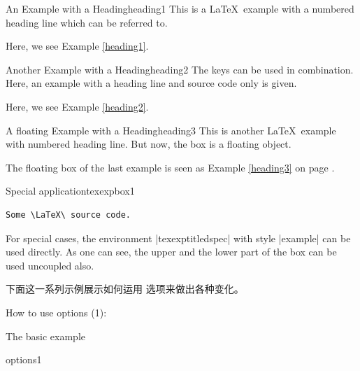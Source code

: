 \begin{dispExample}
\begin{texexptitled}{An Example with a Heading}{heading1}
This is a \LaTeX\ example with a numbered heading line
which can be referred to.
\end{texexptitled}
Here, we see Example \ref{heading1}.
\end{dispExample}


\begin{dispExample}
\begin{texexptitled}{Another Example with a Heading}{heading2}
The keys can be used in combination. Here, an example with a heading line
and source code only is given.
\end{texexptitled}
Here, we see Example \ref{heading2}.
\end{dispExample}


\begin{dispListing}
\begin{texexptitled}[float]{A floating Example with a Heading}{heading3}
This is another \LaTeX\ example with numbered heading line.
But now, the box is a floating object.
\end{texexptitled}
\end{dispListing}
\tcbusetemp

\begin{dispExample}
The floating box of the last example is seen as Example \ref{heading3}
on page \pageref{heading3}.
\end{dispExample}


\begin{dispExample}
\begin{texexptitledspec}{Special application}{texexpbox1}
\begin{lstlisting}[style=tcblatex]
Some \LaTeX\ source code.
\end{lstlisting}
\tcblower
For special cases, the environment |texexptitledspec| with style
|example| can be used directly. As one can see, the upper and the lower
part of the box can be used uncoupled also.
\end{texexptitledspec}
\end{dispExample}


下面这一系列示例展示如何运用  选项来做出各种变化。

\begin{dispExample}
\begin{texexptitled}{How to use options (1):\par The basic example}{options1}
\end{texexptitled}
\end{dispExample}


